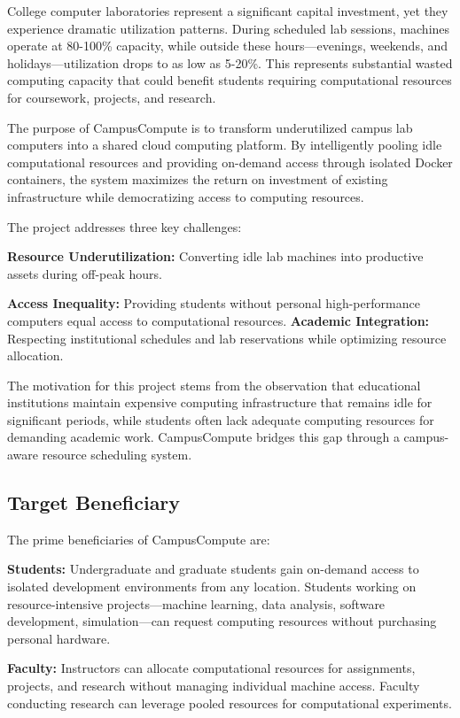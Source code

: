 \documentclass[12pt,a4paper]{article}
\begin{document}
College computer laboratories represent a significant capital investment, yet they experience dramatic utilization patterns. During scheduled lab sessions, machines operate at 80-100\% capacity, while outside these hours—evenings, weekends, and holidays—utilization drops to as low as 5-20\%. This represents substantial wasted computing capacity that could benefit students requiring computational resources for coursework, projects, and research.

The purpose of CampusCompute is to transform underutilized campus lab computers into a shared cloud computing platform. By intelligently pooling idle computational resources and providing on-demand access through isolated Docker containers, the system maximizes the return on investment of existing infrastructure while democratizing access to computing resources.

The project addresses three key challenges:

\textbf{Resource Underutilization:} Converting idle lab machines into productive assets during off-peak hours.

\textbf{Access Inequality:} Providing students without personal high-performance computers equal access to computational resources.
\textbf{Academic Integration:} Respecting institutional schedules and lab reservations while optimizing resource allocation.

The motivation for this project stems from the observation that educational institutions maintain expensive computing infrastructure that remains idle for significant periods, while students often lack adequate computing resources for demanding academic work. CampusCompute bridges this gap through a campus-aware resource scheduling system.

\subsection{Target Beneficiary}
\label{sec:beneficiary}

The prime beneficiaries of CampusCompute are:

\textbf{Students:} Undergraduate and graduate students gain on-demand access to isolated development environments from any location. Students working on resource-intensive projects—machine learning, data analysis, software development, simulation—can request computing resources without purchasing personal hardware.

\textbf{Faculty:} Instructors can allocate computational resources for assignments, projects, and research without managing individual machine access. Faculty conducting research can leverage pooled resources for computational experiments.
\end{document}
